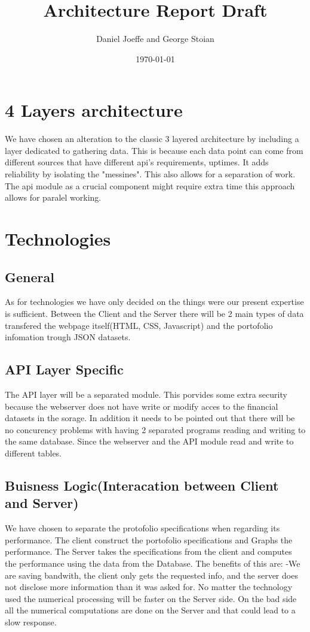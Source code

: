 \documentclass[a4paper,11pt]{article}
\title{Architecture Report Draft}
\date{\today}
\begin{document}
\author{Daniel Joeffe and George Stoian}




\maketitle

\section*{4 Layers architecture}
	We have chosen an alteration to the classic 3 layered architecture by including a layer dedicated to gathering data. This is because each data point can come from different sources that have different api's requirements, uptimes. It adds reliability by isolating the  "messines". This also allows for a separation of work. The api module as a crucial component might require extra time this approach allows for paralel working. 
	



\section*{Technologies}
\subsection*{General}
As for technologies we have only decided on the things were our present expertise is sufficient. Between the Client and the Server there will be 2 main types of data transfered the webpage itself(HTML, CSS, Javascript) and the portofolio infomation trough JSON datasets. 
\subsection*{API Layer Specific}
The API layer will be a separated module. This porvides some extra security because the webserver does not have write or modify acces to the financial datasets in the sorage. In addition it needs to be pointed out that there will be no concurency problems with having 2 separated programs reading and writing to the same database. Since the webserver and the API module read and write to different tables.
\subsection*{Buisness Logic(Interacation between Client and Server)}
We have chosen to separate the protofolio specifications when regarding its performance. The client construct the portofolio specifications and Graphs the performance. The Server takes the specifications from the client and computes the performance using the data from the Database. The benefits of this are: -We are saving bandwith, the client only gets the requested info, and the server does not disclose more information than it was asked for. No matter the technology used the numerical processing will be faster on the Server side. On the bad side all the numerical computations are done on the Server and that could lead to a slow response. 
\end{document}

